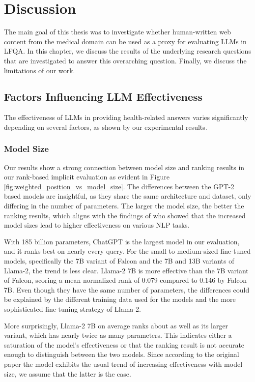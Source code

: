 
\chapter{Discussion}\label{discussion}

The main goal of this thesis was to investigate whether human-written web content from the medical domain can be used as a proxy for evaluating LLMs in LFQA.
In this chapter, we discuss the results of the underlying research questions that are investigated to answer this overarching question.
Finally, we discuss the limitations of our work.

\section{Factors Influencing LLM Effectiveness}

The effectiveness of LLMs in providing health-related answers varies significantly depending on several factors, as shown by our experimental results.

\subsection{Model Size}
Our results show a strong connection between model size and ranking results in our rank-based implicit evaluation as evident in Figure \ref{fig:weighted_position_vs_model_size}. 
The differences between the GPT-2 based models are insightful, as they share the same architecture and dataset, only differing in the number of parameters.
The larger the model size, the better the ranking results, which aligns with the findings of \cite{radford:2019:language} who showed that the increased model sizes lead to higher effectiveness on various NLP tasks.

With 185 billion parameters, ChatGPT is the largest model in our evaluation, and it ranks best on nearly every query.
For the small to medium-sized fine-tuned models, specifically the 7B variant of Falcon and the 7B and 13B variants of Llama-2, the trend is less clear.
Llama-2 7B is more effective than the 7B variant of Falcon, scoring a mean normalized rank of 0.079 compared to 0.146 by Falcon 7B.
Even though they have the same number of parameters, the differences could be explained by the different training data used for the models and the more sophisticated fine-tuning strategy of Llama-2.

More surprisingly, Llama-2 7B on average ranks about as well as its larger variant, which has nearly twice as many parameters.
This indicates either a saturation of the model's effectiveness or that the ranking result is not accurate enough to distinguish between the two models.
Since according to the original paper \cite{touvron:2023:Llama} the model exhibits the usual trend of increasing effectiveness with model size, we assume that the latter is the case.

